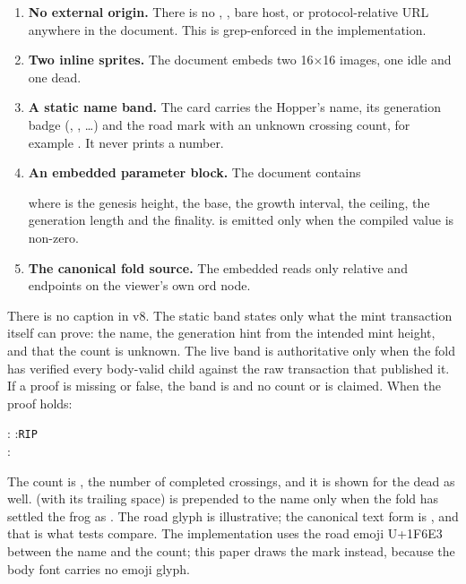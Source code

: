 \begin{enumerate}[leftmargin=1.6em,itemsep=0.25em]
  \item \textbf{No external origin.} There is no ,
        , bare host, or protocol-relative URL anywhere in the
        document. This is grep-enforced in the implementation.
  \item \textbf{Two inline sprites.} The document embeds two
         16$\times$16 images, one idle and
        one dead.
  \item \textbf{A static name band.} The card carries the Hopper's name, its
        generation badge (, , \ldots) and the road mark with
        an unknown crossing count, for example 
        \textperiodcentered{} \roadglyph{} . It never prints a number.
  \item \textbf{An embedded parameter block.} The document contains
        \begin{center}{\scriptsize{}}\end{center}
        where  is the genesis height,  the base, 
        the growth interval,  the ceiling,  the generation
        length and  the finality.  is
        emitted only when the compiled value is non-zero.
  \item \textbf{The canonical fold source.} The embedded 
        reads only relative  and  endpoints
        on the viewer's own ord node.
\end{enumerate}

There is no  caption in v8. The static band
states only what the mint transaction itself can prove: the name, the
generation hint from the intended mint height, and that the count is unknown.
The live band is authoritative only when the fold has verified every
body-valid child against the raw transaction that published it. If a proof is
missing or false, the band is  \textperiodcentered{}
\roadglyph{}  and no count or  is claimed. When the proof
holds:
\begin{center}
\small
{}:\quad {}\qquad
{}:\quad \texttt{RIP }\\[1mm]
:\quad {}
\end{center}
The count is , the number of completed crossings, and it is shown
for the dead as well.  (with its trailing space) is prepended to
the name only when the fold has settled the frog as . The road
glyph is illustrative; the canonical text form is , and that
is what tests compare. The implementation uses the road emoji U+1F6E3
between the name and the count; this paper draws the mark instead, because
the body font carries no emoji glyph.

